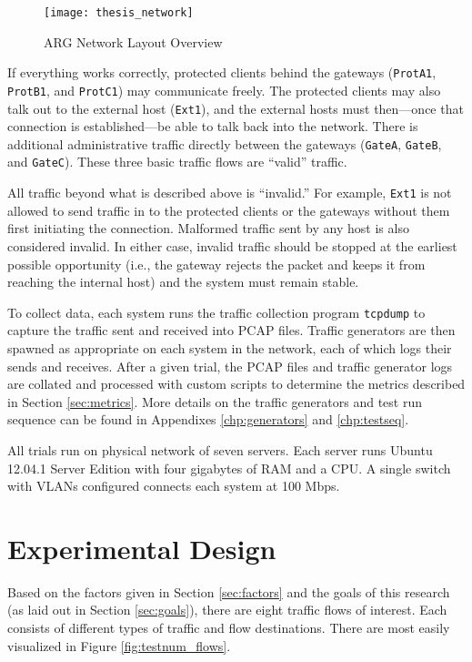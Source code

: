 \begin{figure}
	\centering
	\caption{ARG Network Layout Overview}
	\label{fig:argnetwork}
	\texttt{[image: thesis\_network]}
\end{figure}

\par If everything works correctly, protected clients behind the gateways (\texttt{ProtA1}, \texttt{ProtB1}, and \texttt{ProtC1}) may communicate freely. The protected clients may also talk out to the external host (\texttt{Ext1}), and the external hosts must then---once that connection is established---be able to talk back into the network. There is additional administrative traffic directly between the gateways (\texttt{GateA}, \texttt{GateB}, and \texttt{GateC}). These three basic traffic flows are ``valid'' traffic.

\par All traffic beyond what is described above is ``invalid.'' For example, \texttt{Ext1} is not allowed to send traffic in to the protected clients or the gateways without them first initiating the connection. Malformed traffic sent by any host is also considered invalid. In either case, invalid traffic should be stopped at the earliest possible opportunity (i.e., the gateway rejects the packet and keeps it from reaching the internal host) and the system must remain stable.

\par To collect data, each system runs the traffic collection program \texttt{tcpdump} to capture the traffic sent and received into \ac{PCAP} files. Traffic generators are then spawned as appropriate on each system in the network, each of which logs their sends and receives. After a given trial, the \ac{PCAP} files and traffic generator logs are collated and processed with custom scripts to determine the metrics described in Section \ref{sec:metrics}. More details on the traffic generators and test run sequence can be found in Appendixes \ref{chp:generators} and \ref{chp:testseq}.

\par All trials run on physical network of seven servers. Each server runs Ubuntu 12.04.1 Server Edition with four gigabytes of \ac{RAM} and a  \ac{CPU}. A single switch with \ac{VLAN}s configured connects each system at 100 \ac{Mbps}.

\section{Experimental Design}
\label{sec:exp_design}
\par Based on the factors given in Section \ref{sec:factors} and the goals of this research (as laid out in Section \ref{sec:goals}), there are eight traffic flows of interest. Each consists of different types of traffic and flow destinations. There are most easily visualized in Figure \ref{fig:testnum_flows}.

